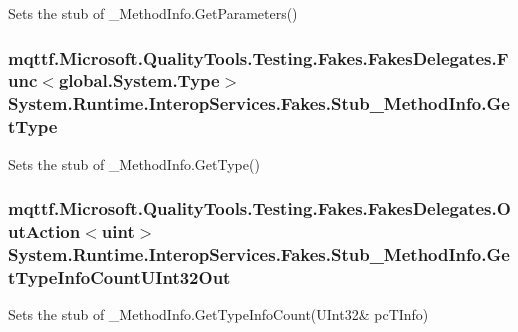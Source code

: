 Sets the stub of \-\_\-\-Method\-Info.\-Get\-Parameters()

\hypertarget{class_system_1_1_runtime_1_1_interop_services_1_1_fakes_1_1_stub___method_info_a6e878103b343d0fa6dddf8149b922031}{
\subsubsection[{Get\-Type}]{\setlength{\rightskip}{0pt plus 5cm}mqttf.\-Microsoft.\-Quality\-Tools.\-Testing.\-Fakes.\-Fakes\-Delegates.\-Func$<$global.\-System.\-Type$>$ System.\-Runtime.\-Interop\-Services.\-Fakes.\-Stub\-\_\-\-Method\-Info.\-Get\-Type}}\label{class_system_1_1_runtime_1_1_interop_services_1_1_fakes_1_1_stub___method_info_a6e878103b343d0fa6dddf8149b922031}


Sets the stub of \-\_\-\-Method\-Info.\-Get\-Type()

\hypertarget{class_system_1_1_runtime_1_1_interop_services_1_1_fakes_1_1_stub___method_info_a91f938d37ca585ee8e616404503d6ff3}{
\subsubsection[{Get\-Type\-Info\-Count\-U\-Int32\-Out}]{\setlength{\rightskip}{0pt plus 5cm}mqttf.\-Microsoft.\-Quality\-Tools.\-Testing.\-Fakes.\-Fakes\-Delegates.\-Out\-Action$<$uint$>$ System.\-Runtime.\-Interop\-Services.\-Fakes.\-Stub\-\_\-\-Method\-Info.\-Get\-Type\-Info\-Count\-U\-Int32\-Out}}\label{class_system_1_1_runtime_1_1_interop_services_1_1_fakes_1_1_stub___method_info_a91f938d37ca585ee8e616404503d6ff3}


Sets the stub of \-\_\-\-Method\-Info.\-Get\-Type\-Info\-Count(U\-Int32\& pc\-T\-Info)

